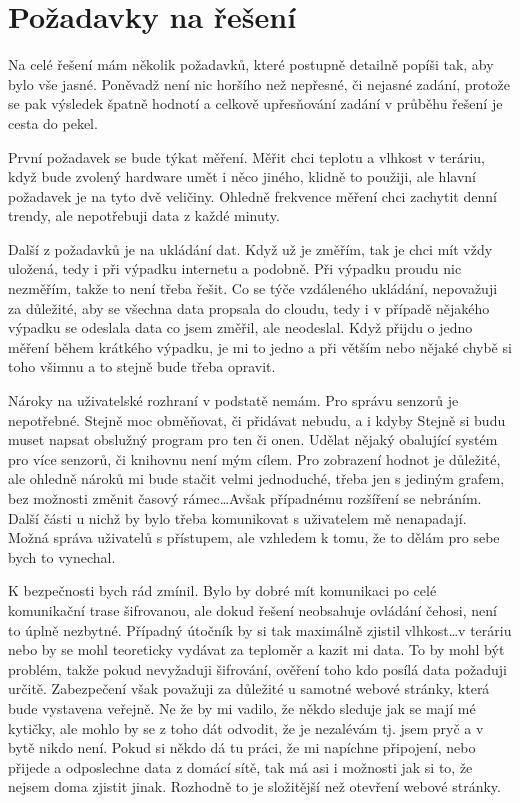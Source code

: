 \chapter{Požadavky na řešení}
Na celé řešení mám několik požadavků, které postupně detailně popíši tak, aby bylo vše jasné. Poněvadž není nic horšího 
než nepřesné, či nejasné zadání, protože se pak výsledek špatně hodnotí a celkově upřesňování zadání v průběhu řešení je 
cesta do pekel.

První požadavek se bude týkat měření. Měřit chci teplotu a vlhkost v teráriu, když bude zvolený hardware umět i něco 
jiného, klidně to použiji, ale hlavní požadavek je na tyto dvě veličiny. Ohledně frekvence měření chci zachytit denní 
trendy, ale nepotřebuji data z každé minuty.

Další z požadavků je na ukládání dat. Když už je změřím, tak je chci mít vždy uložená, tedy i při výpadku internetu 
a podobně. Při výpadku proudu nic nezměřím, takže to není třeba řešit. Co se týče vzdáleného ukládání, nepovažuji za 
důležité, aby se všechna data propsala do cloudu, tedy i v případě nějakého výpadku se odeslala data co jsem změřil, ale 
neodeslal. Když přijdu o jedno měření během krátkého výpadku, je mi to jedno a při větším nebo nějaké chybě si toho 
všimnu a to stejně bude třeba opravit.

Nároky na uživatelské rozhraní v podstatě nemám. Pro správu senzorů je nepotřebné. Stejně moc obměňovat, či přidávat 
nebudu, a i kdyby Stejně si budu muset napsat obslužný program pro ten či onen. Udělat nějaký obalující systém pro více 
senzorů, či knihovnu není mým cílem. Pro zobrazení hodnot je důležité, ale ohledně nároků mi bude stačit velmi 
jednoduché, třeba jen s jediným grafem, bez možnosti změnit časový rámec\ldots Avšak případnému rozšíření se nebráním. 
Další části u nichž by bylo třeba komunikovat s uživatelem mě nenapadají. Možná správa uživatelů s přístupem, ale 
vzhledem k tomu, že to dělám pro sebe bych to vynechal.

K bezpečnosti bych rád zmínil. Bylo by dobré mít komunikaci po celé komunikační trase šifrovanou, ale dokud řešení 
neobsahuje ovládání čehosi, není to úplně nezbytné. Případný útočník by si tak maximálně zjistil vlhkost\ldots v teráriu
nebo by se mohl teoreticky vydávat za teploměr a kazit mi data. To by mohl být problém, takže pokud nevyžaduji 
šifrování, ověření toho kdo posílá data požaduji určitě. Zabezpečení však považuji za důležité u samotné webové stránky, 
která bude vystavena veřejně. Ne že by mi vadilo, že někdo sleduje jak se mají mé kytičky, ale mohlo by se z toho dát 
odvodit, že je nezalévám tj. jsem pryč a v bytě nikdo není. Pokud si někdo dá tu práci, že mi napíchne připojení, nebo 
přijede a odposlechne data z domácí sítě, tak má asi i možnosti jak si to, že nejsem doma zjistit jinak. Rozhodně to je 
složitější než otevření webové stránky.
